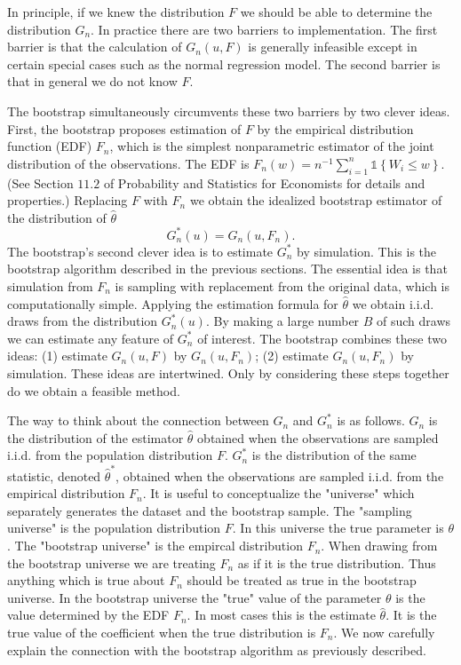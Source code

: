\documentclass[10pt]{article}
\begin{document}
In principle, if we knew the distribution $F$ we should be able to determine the distribution $G_{n}$. In practice there are two barriers to implementation. The first barrier is that the calculation of $G_{n}(u, F)$ is generally infeasible except in certain special cases such as the normal regression model. The second barrier is that in general we do not know $F$.

The bootstrap simultaneously circumvents these two barriers by two clever ideas. First, the bootstrap proposes estimation of $F$ by the empirical distribution function (EDF) $F_{n}$, which is the simplest nonparametric estimator of the joint distribution of the observations. The EDF is $F_{n}(w)=n^{-1} \sum_{i=1}^{n} \mathbb{1}\left\{W_{i} \leq w\right\}$. (See Section $11.2$ of Probability and Statistics for Economists for details and properties.) Replacing $F$ with $F_{n}$ we obtain the idealized bootstrap estimator of the distribution of $\widehat{\theta}$
$$
G_{n}^{*}(u)=G_{n}\left(u, F_{n}\right) .
$$
The bootstrap's second clever idea is to estimate $G_{n}^{*}$ by simulation. This is the bootstrap algorithm described in the previous sections. The essential idea is that simulation from $F_{n}$ is sampling with replacement from the original data, which is computationally simple. Applying the estimation formula for $\hat{\theta}$ we obtain i.i.d. draws from the distribution $G_{n}^{*}(u)$. By making a large number $B$ of such draws we can estimate any feature of $G_{n}^{*}$ of interest. The bootstrap combines these two ideas: (1) estimate $G_{n}(u, F)$ by $G_{n}\left(u, F_{n}\right)$; (2) estimate $G_{n}\left(u, F_{n}\right)$ by simulation. These ideas are intertwined. Only by considering these steps together do we obtain a feasible method.

The way to think about the connection between $G_{n}$ and $G_{n}^{*}$ is as follows. $G_{n}$ is the distribution of the estimator $\widehat{\theta}$ obtained when the observations are sampled i.i.d. from the population distribution $F$. $G_{n}^{*}$ is the distribution of the same statistic, denoted $\widehat{\theta}^{*}$, obtained when the observations are sampled i.i.d. from the empirical distribution $F_{n}$. It is useful to conceptualize the "universe" which separately generates the dataset and the bootstrap sample. The "sampling universe" is the population distribution $F$. In this universe the true parameter is $\theta$. The "bootstrap universe" is the empircal distribution $F_{n}$. When drawing from the bootstrap universe we are treating $F_{n}$ as if it is the true distribution. Thus anything which is true about $F_{n}$ should be treated as true in the bootstrap universe. In the bootstrap universe the "true" value of the parameter $\theta$ is the value determined by the EDF $F_{n}$. In most cases this is the estimate $\widehat{\theta}$. It is the true value of the coefficient when the true distribution is $F_{n}$. We now carefully explain the connection with the bootstrap algorithm as previously described.
\end{document}
